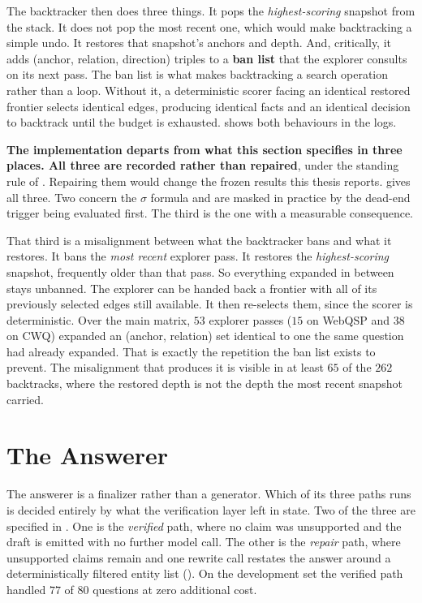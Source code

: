 The backtracker then does three things. It pops the \emph{highest-scoring}
snapshot from the stack. It does not pop the most recent one, which would make
backtracking a simple undo. It restores that snapshot's anchors and depth. And,
critically, it adds \textsf{(anchor, relation, direction)} triples to a
\textbf{ban list} that the explorer consults on its next pass. The ban list is
what makes backtracking a search operation rather than a loop. Without it, a
deterministic scorer facing an identical restored frontier selects identical
edges, producing identical facts and an identical decision to backtrack until
the budget is exhausted.  shows both behaviours in
the logs.

\textbf{The implementation departs from what this section specifies in three
places. All three are recorded rather than repaired}, under the standing rule of
. Repairing them would change the frozen results
this thesis reports.  gives all three. Two
concern the $\sigma$ formula and are masked in practice by the dead-end trigger
being evaluated first. The third is the one with a measurable consequence.

That third is a misalignment between what the backtracker bans and what it
restores. It bans the \emph{most recent} explorer pass. It restores the
\emph{highest-scoring} snapshot, frequently older than that pass. So everything
expanded in between stays unbanned. The explorer can be handed back a frontier
with all of its previously selected edges still available. It then re-selects
them, since the scorer is deterministic. Over the main matrix, $53$ explorer
passes ($15$ on WebQSP and $38$ on CWQ) expanded an \textsf{(anchor, relation)}
set identical to one the same question had already expanded. That is exactly the
repetition the ban list exists to prevent. The misalignment that produces it is
visible in at least $65$ of the $262$ backtracks, where the restored depth is
not the depth the most recent snapshot carried.

\section{The Answerer}\label{sec:answerer}

The answerer is a finalizer rather than a generator. Which of
its three paths runs is decided entirely by what the verification layer left in
state. Two of the three are specified in . One is
the \emph{verified} path, where no claim was unsupported and the draft is
emitted with no further model call. The other is the \emph{repair} path, where
unsupported claims remain and one rewrite call restates the answer around a
deterministically filtered entity list (). On the
development set the verified path handled $77$ of $80$ questions at zero
additional cost.

